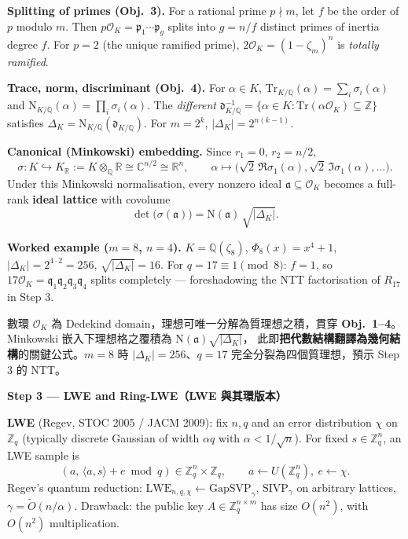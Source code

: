 \documentclass[12pt, a4paper]{article}
\begin{document}
\textbf{Splitting of primes (Obj.\ 3).} For a rational prime $p\nmid m$, let $f$ be the order
of $p$ modulo $m$. Then $p\mathcal{O}_K=\mathfrak{p}_1\cdots\mathfrak{p}_g$ splits into $g=n/f$
distinct primes of inertia degree $f$. For $p=2$ (the unique ramified prime),
$2\mathcal{O}_K=(1-\zeta_m)^n$ is \textit{totally ramified}.

\textbf{Trace, norm, discriminant (Obj.\ 4).} For $\alpha\in K$,
$\mathrm{Tr}_{K/\mathbb{Q}}(\alpha)=\sum_i\sigma_i(\alpha)$ and
$\mathrm{N}_{K/\mathbb{Q}}(\alpha)=\prod_i\sigma_i(\alpha)$. The \textit{different}
$\mathfrak{d}_{K/\mathbb{Q}}^{-1}=\{\alpha\in K:\mathrm{Tr}(\alpha\mathcal{O}_K)\subseteq\mathbb{Z}\}$
satisfies $\Delta_K=\mathrm{N}_{K/\mathbb{Q}}(\mathfrak{d}_{K/\mathbb{Q}})$. For $m=2^k$,
$|\Delta_K|=2^{n(k-1)}$.

\textbf{Canonical (Minkowski) embedding.} Since $r_1=0$, $r_2=n/2$,
\[
  \sigma\colon K\hookrightarrow K_{\mathbb{R}}:=K\otimes_{\mathbb{Q}}\mathbb{R}\cong\mathbb{C}^{n/2}\cong\mathbb{R}^n,
  \qquad \alpha\mapsto\bigl(\sqrt{2}\,\Re\sigma_1(\alpha),\sqrt{2}\,\Im\sigma_1(\alpha),\ldots\bigr).
\]
Under this Minkowski normalisation, every nonzero ideal $\mathfrak{a}\subseteq\mathcal{O}_K$ becomes
a full-rank \textbf{ideal lattice} with covolume
\[
  \det\bigl(\sigma(\mathfrak{a})\bigr) = \mathrm{N}(\mathfrak{a})\,\sqrt{|\Delta_K|}.
\]

\textbf{Worked example ($m=8$, $n=4$).} $K=\mathbb{Q}(\zeta_8)$, $\Phi_8(x)=x^4+1$,
$|\Delta_K|=2^{4\cdot 2}=256$, $\sqrt{|\Delta_K|}=16$. For $q=17\equiv 1\pmod 8$: $f=1$,
so $17\mathcal{O}_K=\mathfrak{q}_1\mathfrak{q}_2\mathfrak{q}_3\mathfrak{q}_4$ splits completely
— foreshadowing the NTT factorisation of $R_{17}$ in Step 3.

數環 $\mathcal{O}_K$ 為 Dedekind domain，理想可唯一分解為質理想之積，貫穿 \textbf{Obj.\ 1--4}。
Minkowski 嵌入下理想格之覆積為 $\mathrm{N}(\mathfrak{a})\sqrt{|\Delta_K|}$，
此即\textbf{把代數結構翻譯為幾何結構}的關鍵公式。$m=8$ 時 $|\Delta_K|=256$、$q=17$
完全分裂為四個質理想，預示 Step 3 的 NTT。

\medskip
\textbf{Step 3 --- LWE and Ring-LWE（LWE 與其環版本）}

\textbf{LWE} (Regev, STOC 2005 / JACM 2009): fix $n,q$ and an error distribution $\chi$ on
$\mathbb{Z}_q$ (typically discrete Gaussian of width $\alpha q$ with $\alpha<1/\sqrt{n}$). For
fixed $s\in\mathbb{Z}_q^n$, an LWE sample is
\[
  (a,\,\langle a,s\rangle+e\bmod q)\in\mathbb{Z}_q^n\times\mathbb{Z}_q,
  \qquad a\leftarrow U(\mathbb{Z}_q^n),\ e\leftarrow\chi.
\]
Regev's quantum reduction:
$\mathrm{LWE}_{n,q,\chi}\longleftarrow\mathrm{GapSVP}_\gamma,\,\mathrm{SIVP}_\gamma$ on arbitrary
lattices, $\gamma=\widetilde{O}(n/\alpha)$. Drawback: the public key $A\in\mathbb{Z}_q^{n\times m}$
has size $O(n^2)$, with $O(n^2)$ multiplication.
\end{document}

